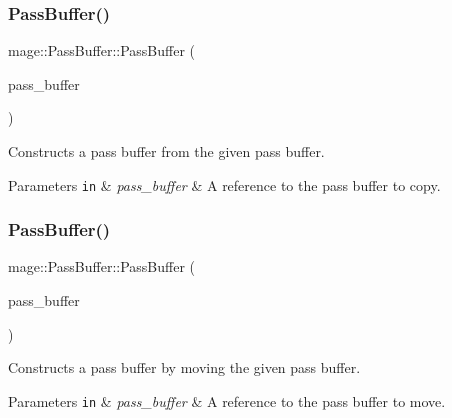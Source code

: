 \subsubsection{\texorpdfstring{Pass\+Buffer()}{PassBuffer()}\hspace{0.1cm}{\footnotesize\ttfamily [2/3]}}
{\footnotesize\ttfamily mage\+::\+Pass\+Buffer\+::\+Pass\+Buffer (\begin{DoxyParamCaption}\item[{const \hyperlink{structmage_1_1_pass_buffer}{Pass\+Buffer} \&}]{pass\+\_\+buffer }\end{DoxyParamCaption})\hspace{0.3cm}{\ttfamily [default]}}

Constructs a pass buffer from the given pass buffer.


\begin{DoxyParams}[1]{Parameters}
\mbox{\tt in}  & {\em pass\+\_\+buffer} & A reference to the pass buffer to copy. \\
\hline
\end{DoxyParams}
\hypertarget{structmage_1_1_pass_buffer_a8f6baa279c6dc8c5b6869240d0169677}{}\label{structmage_1_1_pass_buffer_a8f6baa279c6dc8c5b6869240d0169677} 
\subsubsection{\texorpdfstring{Pass\+Buffer()}{PassBuffer()}\hspace{0.1cm}{\footnotesize\ttfamily [3/3]}}
{\footnotesize\ttfamily mage\+::\+Pass\+Buffer\+::\+Pass\+Buffer (\begin{DoxyParamCaption}\item[{\hyperlink{structmage_1_1_pass_buffer}{Pass\+Buffer} \&\&}]{pass\+\_\+buffer }\end{DoxyParamCaption})\hspace{0.3cm}{\ttfamily [default]}}

Constructs a pass buffer by moving the given pass buffer.


\begin{DoxyParams}[1]{Parameters}
\mbox{\tt in}  & {\em pass\+\_\+buffer} & A reference to the pass buffer to move. \\
\hline
\end{DoxyParams}
\hypertarget{structmage_1_1_pass_buffer_a650dec579522b7d5c5810a535b10773a}{}\label{structmage_1_1_pass_buffer_a650dec579522b7d5c5810a535b10773a} 
